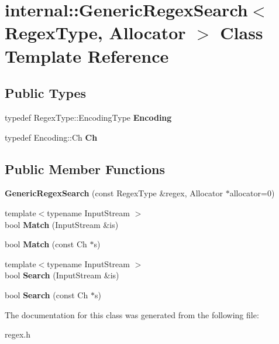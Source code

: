 \hypertarget{a02268}{}\section{internal\+:\+:Generic\+Regex\+Search$<$ Regex\+Type, Allocator $>$ Class Template Reference}
\label{a02268}
\subsection*{Public Types}
\begin{DoxyCompactItemize}
\item 
\mbox{\label{a02268_a7b1f81c580c33200c83e1529c2fdbf54}} 
typedef Regex\+Type\+::\+Encoding\+Type {\bfseries Encoding}
\item 
\mbox{\label{a02268_a966f3a62fc838b5e9350f4c6a624d9a1}} 
typedef Encoding\+::\+Ch {\bfseries Ch}
\end{DoxyCompactItemize}
\subsection*{Public Member Functions}
\begin{DoxyCompactItemize}
\item 
\mbox{\label{a02268_a72f70e210a4bc944dba62655a008750b}} 
{\bfseries Generic\+Regex\+Search} (const Regex\+Type \&regex, Allocator $\ast$allocator=0)
\item 
\mbox{\label{a02268_ad204164a20e3ac403b405683b51c2d0b}} 
{\footnotesize template$<$typename Input\+Stream $>$ }\\bool {\bfseries Match} (Input\+Stream \&is)
\item 
\mbox{\label{a02268_a9d3fe83905549d2fd4c513b8eacd14de}} 
bool {\bfseries Match} (const Ch $\ast$s)
\item 
\mbox{\label{a02268_a766c684321471b468ff468648f186cf0}} 
{\footnotesize template$<$typename Input\+Stream $>$ }\\bool {\bfseries Search} (Input\+Stream \&is)
\item 
\mbox{\label{a02268_a97398161c60f3ed3e4aabaff952c6f1e}} 
bool {\bfseries Search} (const Ch $\ast$s)
\end{DoxyCompactItemize}


The documentation for this class was generated from the following file\+:\begin{DoxyCompactItemize}
\item 
regex.\+h\end{DoxyCompactItemize}
